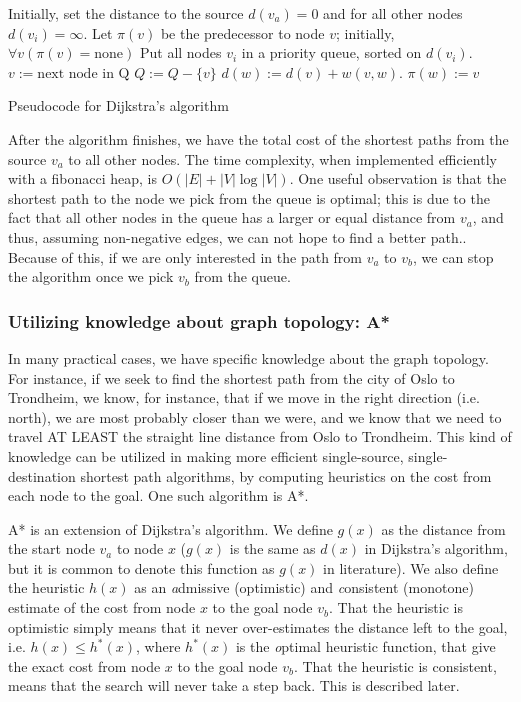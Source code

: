 \begin{algorithm}
\begin{algorithmic}
\STATE Initially, set the distance to the source $d(v_a)=0$ and for all other nodes $d(v_i) = \infty$.
\STATE Let $\pi(v)$ be the predecessor to node $v$; initially, $\forall v (\pi(v) = \mbox{none})$ 
\STATE Put all nodes $v_i$ in a priority queue, sorted on $d(v_i)$.
    \STATE $v := \mbox{next node in Q}$
    \STATE $Q:= Q - \{v\}$
            \STATE $d(w) :=  d(v)+w(v, w)$.
            \STATE $\pi(w):= v$
        \ENDIF
    \ENDFOR
\ENDWHILE
\end{algorithmic}
\caption{Pseudocode for Dijkstra's algorithm}
\label{alg:dijkstra}
\end{algorithm}

After the algorithm finishes, we have the total cost of the shortest paths from the source $v_a$ to all other nodes. The time complexity, when implemented efficiently with a fibonacci heap, is $O(|E|+|V|\log |V|)$\cite{fibodijkstra}. One useful observation is that the shortest path to the node we pick from the queue is optimal; this is due to the fact that all other nodes in the queue has a larger or equal distance from $v_a$, and thus, assuming non-negative edges, we can not hope to find a better path.. Because of this, if we are only interested in the path from $v_a$ to $v_b$, we can stop the algorithm once we pick $v_b$ from the queue. 

\subsubsection{Utilizing knowledge about graph topology: A*}
In many practical cases, we have specific knowledge about the graph topology. For instance, if we seek to find the shortest path from the city of Oslo to Trondheim, we know, for instance, that if we move in the right direction (i.e. north), we are most probably closer than we were, and we know that we need to travel AT LEAST the straight line distance from Oslo to Trondheim. This kind of knowledge can be utilized in making more efficient single-source, single-destination shortest path algorithms, by computing heuristics on the cost from each node to the goal. One such algorithm is A*.\cite{astar}

A* is an extension of Dijkstra's algorithm. We define $g(x)$ as the distance from the start node $v_a$ to node $x$ ($g(x)$ is the same as $d(x)$ in Dijkstra's algorithm, but it is common to denote this function as $g(x)$ in literature). We also define the heuristic $h(x)$ as an {\textit admissive} (optimistic) and {\textit consistent} (monotone) estimate of the cost from node $x$ to the goal node $v_b$. That the heuristic is optimistic simply means that it never over-estimates the distance left to the goal, i.e. $h(x) \leq h^*(x)$, where $h^*(x)$ is the {\textit optimal} heuristic function, that give the exact cost from node $x$ to the goal node $v_b$. That the heuristic is consistent, means that the search will never take a step back. This is described later.

